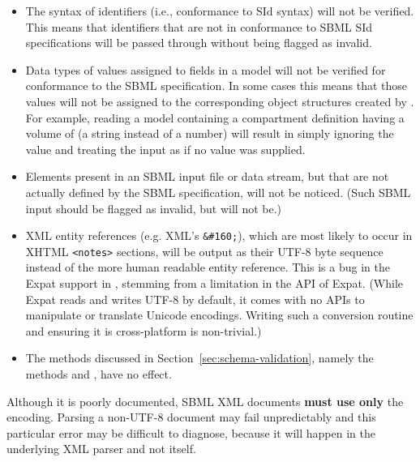 \documentclass{sbmlmanual}
\begin{document}
\begin{itemize}

\item The syntax of identifiers (i.e., conformance to SId syntax) will not
  be verified.  This means that identifiers that are not in conformance to
  SBML SId specifications will be passed through without being flagged as
  invalid.

\item Data types of values assigned to fields in a model will not be
  verified for conformance to the SBML specification.  In some cases this
  means that those values will not be assigned to the corresponding object
  structures created by \libsbml{}.  For example, reading a model
  containing a compartment definition having a volume of  (a
  string instead of a number) will result in \libsbml{} simply ignoring the
  value and treating the input as if no value was supplied.

\item Elements present in an SBML input file or data stream, but that are
  not actually defined by the SBML specification, will not be noticed.
  (Such SBML input should be flagged as invalid, but will not be.)
  
\item XML entity references (e.g. XML's \verb|&#160;|), which are most
  likely to occur in XHTML \verb|<notes>| sections, will be output as their
  UTF-8 byte sequence instead of the more human readable entity reference.
  This is a bug in the Expat support in \libsbml{}, stemming from a
  limitation in the API of Expat.  (While Expat reads and writes UTF-8 by
  default, it comes with no APIs to manipulate or translate Unicode
  encodings.  Writing such a conversion routine and ensuring it is
  cross-platform is non-trivial.)
  
\item The methods discussed in Section~\ref{sec:schema-validation}, namely
  the  methods and
  , have no effect.

\end{itemize}


Although it is poorly documented, SBML XML documents \textbf{must use only}
the  encoding.  Parsing a non-UTF-8 document may fail
unpredictably and this particular error may be difficult to diagnose,
because it will happen in the underlying XML parser and not \libsbml{}
itself.
\end{document}
